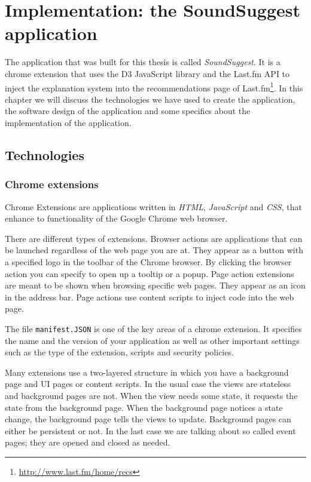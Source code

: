 \chapter{Implementation: the SoundSuggest application}\label{chapter:implementation}

The application that was built for this thesis is called \emph{SoundSuggest}. It is a chrome extension that uses the D3 JavaScript library and the Last.fm API to inject the explanation system into the recommendations page of Last.fm\footnote{\url{http://www.last.fm/home/recs}}. In this chapter we will discuss the technologies we have used to create the application, the software design of the application and some specifics about the implementation of the application.


\section{Technologies}\label{chapter:implementation:section:technologies}

\subsection{Chrome extensions}\label{chapter:implementation:section:technologies:subsection:chrome}

Chrome Extensions are applications written in \emph{HTML}, \emph{JavaScript} and \emph{CSS}, that enhance to functionality of the Google Chrome web browser\cite{google:2012:extensions}.

There are different types of extensions. Browser actions are applications that can be launched regardless of the web page you are at. They appear as a button with a specified logo in the toolbar of the Chrome browser. By clicking the browser action you can specify to open up a tooltip or a popup\cite{google:2012:browseraction}. Page action extensions are meant to be shown when browsing specific web pages. They appear as an icon in the address bar. Page actions use content scripts to inject code into the web page\cite{google:2012:overview}.

The file \texttt{manifest.JSON} is one of the key areas of a chrome extension. It specifies the name and the version of your application as well as other important settings such as the type of the extension, scripts and security policies\cite{google:2012:manifest}.

Many extensions use a two-layered structure in which you have a background page and UI pages or content scripts\cite{google:2012:overview}. In the usual case the views are stateless and background pages are not. When the view needs some state, it requests the state from the background page. When the background page notices a state change, the background page tells the views to update\cite{google:2012:background}. Background pages can either be persistent or not. In the last case we are talking about so called event pages; they are opened and closed as needed\cite{google:2012:overview}.

